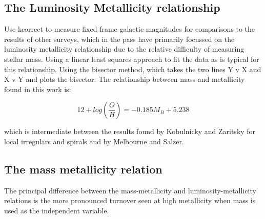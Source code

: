 \documentclass{literature}
\begin{document}
\subsection{The Luminosity Metallicity relationship}
Use kcorrect \citep{Blanton_2003} to measure fixed frame galactic magnitudes for comparisons to the results of other surveys, which in the pass have primarily focussed on the luminosity metallicity relationship due to the relative difficulty of measuring stellar mass. Using a linear least squares approach to fit the data as is typical for this relationship. Using the bisector method, which takes the two lines Y v X and X v Y and plots the bisector. The relationship between mass and metallicity found in this work is: 

\begin{equation}
 	12 + log(\frac{O}{H}) = -0.185M_{B} + 5.238
 \end{equation} 

which is intermediate between the results found by Kobulnicky and Zaritsky \citep{Kobulnicky_1999} for local irregulars and spirals and by Melbourne and Salzer. 
\subsection{The mass metallicity relation}
The principal difference between the mass-metallicity and luminosity-metallicity relations is the more pronounced turnover seen at high metallicity when mass is used as the independent variable.
\end{document}
